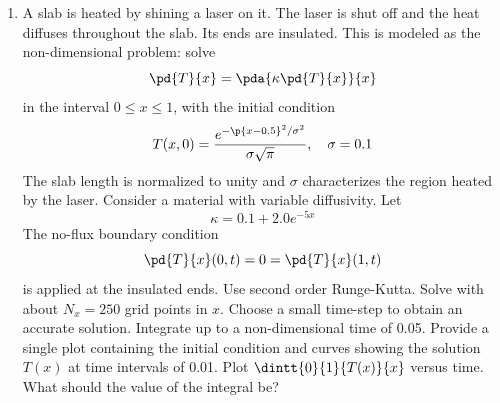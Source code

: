 \documentclass[11pt, oneside]{article}
\begin{document}
\begin{enumerate}
  \item %
    A slab is heated by shining a laser on it.
    The laser is shut off and the heat diffuses throughout the slab.
    Its ends are insulated.
    This is modeled as the non-dimensional problem: solve
    \[
      \pd{T}{x} = \pda{\kappa \pd{T}{x}}{x}
    \]
    in the interval $0 \le x \le 1$, with the initial condition
    \[
      T(x, 0) = \frac{e^{-\p{x - 0.5}^2/\sigma^2}}{\sigma \sqrt{\pi}}, \quad \sigma = 0.1
    \]
    The slab length is normalized to unity and $\sigma$ characterizes the
    region heated by the laser.
    Consider a material with variable diffusivity.
    Let
    \[
      \kappa = 0.1 + 2.0 e^{-5x}
    \]
    The no-flux boundary condition
    \[
      \pd{T}{x}(0, t) = 0 = \pd{T}{x}(1, t)
    \]
    is applied at the insulated ends.
    Use second order Runge-Kutta.
    Solve with about $N_x = 250$ grid points in $x$.
    Choose a small time-step to obtain an accurate solution.
    Integrate up to a non-dimensional time of 0.05.
    Provide a single plot containing the initial condition and curves showing
    the solution $T(x)$ at time intervals of 0.01.
    Plot $\dintt{0}{1}{T(x)}{x}$ versus time.
    What should the value of the integral be?


\end{enumerate}
\end{document}

